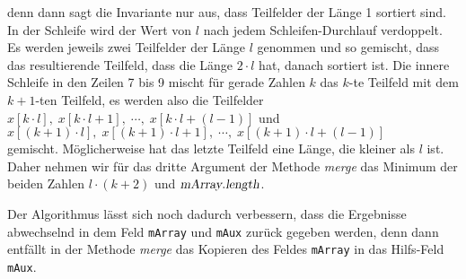 denn dann sagt die Invariante nur aus, dass Teilfelder der L\"ange 1 sortiert sind.  In der
Schleife wird der Wert von $l$ nach jedem Schleifen-Durchlauf verdoppelt.   
Es werden jeweils zwei Teilfelder der L\"ange $l$ genommen und so gemischt, dass das
resultierende Teilfeld, dass die L\"ange $2\cdot l$ hat, danach sortiert ist.  Die innere Schleife in
den Zeilen 7 bis 9 mischt f\"ur gerade Zahlen $k$ das $k$-te Teilfeld mit dem $k+1$-ten
Teilfeld, es werden also die Teilfelder
\\[0.2cm]
\hspace*{1.3cm}
$x[k\cdot l],\;x[k\cdot l+1],\;\cdots,\;x[k\cdot l+(l-1)]$ \quad und
\\[0.2cm]
\hspace*{1.3cm}
 $x[(k+1)\cdot l],\;x[(k+1)\cdot l+1],\;\cdots,\;x[(k+1)\cdot l+(l-1)]$ 
\\[0.2cm]
gemischt.  M\"oglicherweise hat das letzte Teilfeld eine L\"ange, die kleiner als $l$ ist.
Daher nehmen wir f\"ur das dritte Argument der Methode \textsl{merge} das Minimum der beiden
Zahlen $l\cdot(k+2)$ und $\textsl{mArray}.\textsl{length}$.

Der Algorithmus l\"asst sich noch dadurch verbessern, dass die Ergebnisse abwechselnd in dem 
Feld \texttt{mArray} und \texttt{mAux} zur\"uck gegeben werden, denn dann entf\"allt in der
Methode \textsl{merge} das Kopieren
des Feldes \texttt{mArray} in das Hilfs-Feld \texttt{mAux}.  
\pagebreak


